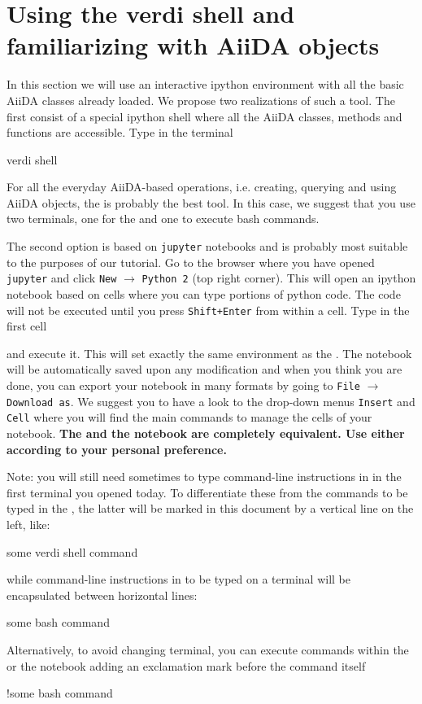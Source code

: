 \section[Verdi shell and AiiDA objects]{Using the verdi shell and familiarizing
with AiiDA objects\label{shell}}

In this section we will use an interactive ipython environment with all the basic AiiDA classes
already loaded. We propose two realizations of such a tool. The first consist of a special ipython shell where all the AiiDA classes, methods and functions are accessible.
Type in the terminal
\begin{bashcommand}
 verdi shell
\end{bashcommand}
For all the everyday AiiDA-based operations, i.e. creating,
querying and using AiiDA objects, the  is probably the best tool.
In this case, we suggest that you use two terminals, one for the  and one to execute bash commands.

The second option is based on \texttt{jupyter} notebooks and is probably most suitable to the purposes of our tutorial. Go to the browser where you have opened \texttt{jupyter} and click \texttt{New} $\to$ \texttt{Python 2} (top right corner). This will open an ipython notebook based on cells where you can type portions of python code. The code will not be executed until you press \verb|Shift+Enter| from within a cell. 
Type in the first cell 
\begin{pythoncommand}
\end{pythoncommand}
and execute it. This will set exactly the same environment as the .
The notebook will be automatically saved upon any modification and when you think you are done, you can export your notebook in many formats by going to \verb|File| $\to$ \verb|Download as|. We suggest you to have a look to the drop-down menus \texttt{Insert} and \texttt{Cell} where you will find the main commands to manage the cells of your notebook. 
\textbf{The  and the  notebook are completely equivalent. Use either according to your personal preference.}

Note: you will still need sometimes to type command-line
instructions in  in the first terminal you opened today. 
To differentiate these from the commands to be typed in the
, the latter will be marked in this document by a vertical line
on the left, like:
\begin{pythoncommand}
 some verdi shell command
\end{pythoncommand}
while command-line instructions in  to be typed on a terminal will
be encapsulated between horizontal lines:
\begin{bashcommand}
 some bash command
\end{bashcommand}
Alternatively, to avoid changing terminal, you can execute  commands within the  or the notebook adding an exclamation mark before the command itself
\begin{pythoncommand}
 !some bash command
\end{pythoncommand}


